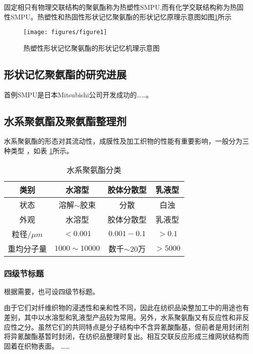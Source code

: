 固定相只有物理交联结构的聚氨酯称为热塑性SMPU,而有化学交联结构称为热固性SMPU。热塑性和热固性形状记忆聚氨酯的形状记忆原理示意图如图\ref{fig:diagram}所示

\begin{figure}[hbt]
 \centering
 \texttt{[image: figures/figure1]}
 \caption{热塑性形状记忆聚氨酯的形状记忆机理示意图}\label{fig:diagram}
\end{figure}


\subsection{形状记忆聚氨酯的研究进展}
首例SMPU是日本Mitsubishi公司开发成功的……。

\subsection{水系聚氨酯及聚氨酯整理剂}

水系聚氨酯的形态对其流动性，成膜性及加工织物的性能有重要影响，一般分为三种类型\cite{Jiang2005Size} ，如表 \ref{tab:category}所示。

\begin{table}[hbt]
  \centering
  \caption{水系聚氨酯分类} \label{tab:category}
  \begin{tabular*}{0.9\textwidth}{@{\extracolsep{\fill}}cccc}
  \toprule
    类别			&水溶型		&胶体分散型		&乳液型 \\
  \midrule
    状态			&溶解$\sim$胶束	&分散		&白浊 \\
    外观			&水溶型		&胶体分散型		&乳液型 \\
    粒径$/\mu m$	&$<0.001$		&$0.001-0.1$		&$>0.1$ \\
    重均分子量	&$1000\sim 10000$	&数千$\sim 20$万 &$>5000$ \\
  \bottomrule
  \end{tabular*}
\end{table}

\subsubsection{四级节标题}

根据需要，也可设四级节标题。

由于它们对纤维织物的浸透性和亲和性不同，因此在纺织品染整加工中的用途也有差别，其中以水溶型和乳液型产品较为常用。另外，水系聚氨酯又有反应性和非反应性之分。虽然它们的共同特点是分子结构中不含异氰酸酯基，但前者是用封闭剂将异氰酸酯基暂时封闭，在纺织品整理时复出。相互交联反应形成三维网状结构而固着在织物表面。
……
